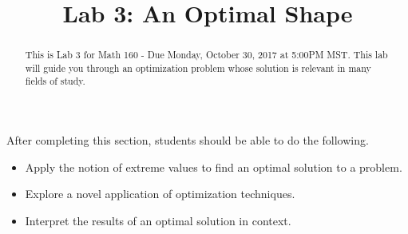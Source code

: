\documentclass{ximera}
\title{Lab 3: An Optimal Shape}
\begin{document}
\begin{abstract}
This is Lab 3 for Math 160 - Due Monday, October 30, 2017 at 5:00PM MST. This lab will guide you through an optimization problem whose solution is relevant in many fields of study.
\end{abstract}

\maketitle

\begin{sectionOutcomes}

After completing this section, students should be able to do the following.

\begin{itemize}
\item Apply the notion of extreme values to find an optimal solution to a problem.
\item Explore a novel application of optimization techniques.
\item Interpret the results of an optimal solution in context.
\end{itemize}

\end{sectionOutcomes}
\end{document}
